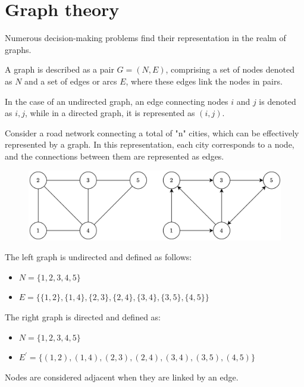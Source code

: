 \section{Graph theory}

Numerous decision-making problems find their representation in the realm of graphs.
\begin{definition}
    A graph is described as a pair $G=(N,E)$, comprising a set of nodes denoted as $N$ and a set of edges or arcs $E$, where these edges link the nodes in pairs.
\end{definition}   
\begin{definition}
    In the case of an undirected graph, an edge connecting nodes $i$ and $j$ is denoted as ${i,j}$, while in a directed graph, it is represented as $(i,j)$.    
\end{definition}
\begin{example}
    Consider a road network connecting a total of "n" cities, which can be effectively represented by a graph. 
    In this representation, each city corresponds to a node, and the connections between them are represented as edges.        
    \begin{figure}[H]
        \centering
        \includegraphics[width=0.6\linewidth]{images/graph.png}
    \end{figure}
    The left graph is undirected and defined as follows:
    \begin{itemize}
        \item $N=\{1,2,3,4,5\}$
        \item $E=\{\{1,2\},\{1,4\},\{2,3\},\{2,4\},\{3,4\},\{3,5\},\{4,5\}\}$
    \end{itemize}
    The right graph is directed and defined as:
    \begin{itemize}
        \item $N=\{1,2,3,4,5\}$
        \item $E^{'}=\{(1,2),(1,4),(2,3),(2,4),(3,4),(3,5),(4,5)\}$
    \end{itemize}
\end{example}
\newpage
\begin{definition}
    Nodes are considered adjacent when they are linked by an edge.
\end{definition}
